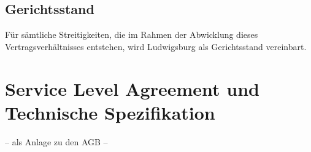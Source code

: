 \documentclass{terms}
\begin{document}
\subsection{Gerichtsstand}
Für sämtliche Streitigkeiten, die im Rahmen der Abwicklung dieses Vertragsverhältnisses entstehen, wird Ludwigsburg als Gerichtsstand vereinbart.

\newpage
\section{Service Level Agreement und Technische Spezifikation}
\vspace*{-3mm}
\begin{center}– als Anlage zu den AGB –\end{center}
\vspace*{-3mm}
\end{document}
